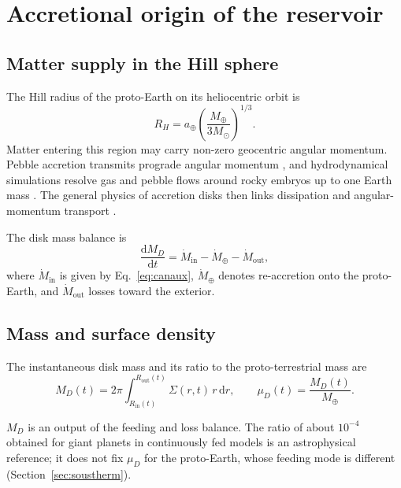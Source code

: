 \documentclass[11pt,a4paper,openany]{report}
\newcommand{\Mt}{M_{\oplus}}
\newcommand{\dd}{\mathrm{d}}
\begin{document}
\section{Accretional origin of the reservoir}
\subsection{Matter supply in the Hill sphere}

The Hill radius of the proto-Earth on its heliocentric orbit is
\begin{equation}
R_H=a_\oplus\left(\frac{\Mt}{3M_\odot}\right)^{1/3}.
\label{eq:RH}
\end{equation}
Matter entering this region may carry non-zero geocentric angular momentum. Pebble accretion
transmits prograde angular momentum \cite{JohansenLacerda2010,Visser2020}, and hydrodynamical
simulations resolve gas and pebble flows around rocky embryos up to one Earth mass
\cite{Popovas2018}. The general physics of accretion disks then links dissipation and
angular-momentum transport \cite{Pringle1981}.

The disk mass balance is
\begin{equation}
\frac{\dd M_D}{\dd t}=\dot M_{\mathrm{in}}-\dot M_{\oplus}-\dot M_{\mathrm{out}},
\label{eq:bilanM}
\end{equation}
where $\dot M_{\mathrm{in}}$ is given by Eq.~\eqref{eq:canaux}, $\dot M_\oplus$ denotes re-accretion
onto the proto-Earth, and $\dot M_{\mathrm{out}}$ losses toward the exterior.

\subsection{Mass and surface density}

The instantaneous disk mass and its ratio to the proto-terrestrial mass are
\begin{equation}
M_D(t)=2\pi\int_{R_{\mathrm{in}}(t)}^{R_{\mathrm{out}}(t)}\Sigma(r,t)\,r\,\dd r,
\qquad
\mu_D(t)=\frac{M_D(t)}{\Mt}.
\label{eq:MD}
\end{equation}

\begin{lecture}
$M_D$ is an output of the feeding and loss balance. The ratio of about $10^{-4}$ obtained for giant
planets in continuously fed models \cite{CanupWard2006} is an astrophysical reference; it does not
fix $\mu_D$ for the proto-Earth, whose feeding mode is different (Section~\ref{sec:soustherm}).
\end{lecture}
\end{document}
